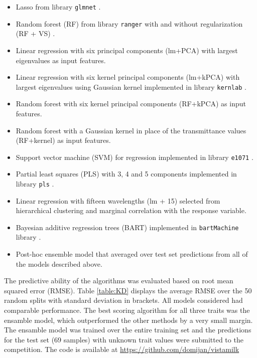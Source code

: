 \begin{itemize}
\item Lasso from library \texttt{glmnet} \citep{glmnet}.
\item Random forest (RF) from library \texttt{ranger} \citep{ranger} with and without regularization (RF + VS) \citep{regrf}.
\item Linear regression with six principal components (lm+PCA) with largest eigenvalues as input features.
\item Linear regression with six kernel principal components (lm+kPCA) with largest eigenvalues using Gaussian kernel implemented in library \texttt{kernlab} \citep{kernlab}.
\item Random forest with six kernel principal components (RF+kPCA) as input features.
\item Random forest with a Gaussian kernel in place of the transmittance values (RF+kernel) as input features.
\item Support vector machine (SVM) for regression implemented in library \texttt{e1071} \citep{e1071}.
\item Partial least squares (PLS) with 3, 4 and 5 components implemented in library \texttt{pls} \citep{pls}.
\item Linear regression with fifteen wavelengths (lm + 15) selected from hierarchical clustering and marginal correlation with the response variable. 
\item Bayesian additive regression trees (BART) \citep{bart} implemented in \texttt{bartMachine} library \citep{bartMachine}.
\item Post-hoc ensemble model that averaged over test set predictions from all of the models described above.
\end{itemize}


The predictive ability of the algorithms was evaluated based on root mean squared error (RMSE). Table \ref{table:KD} displays the average RMSE over the 50 random splits with standard deviation in brackets. All models considered had comparable performance. The best scoring algorithm for all three traits was the ensamble model, which outperformed the other methods by a very small margin. The ensamble model was trained over the entire training set and the predictions for the test set (69 samples) with unknown trait values were submitted to the competition. 
The code is available at \url{https://github.com/domijan/vistamilk}


